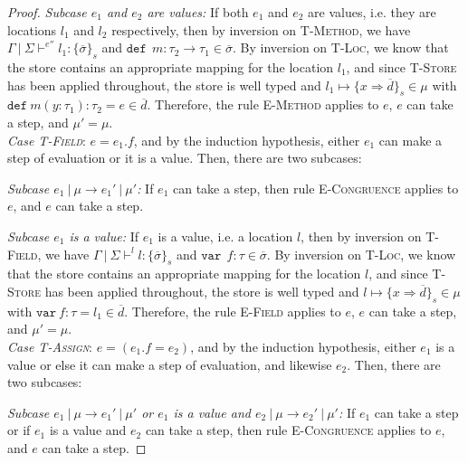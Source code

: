 \documentclass{llncs}
\newcommand{\keywadj}[1]{\mathtt{#1}}
\newcommand{\keyw}[1]{\keywadj{#1}~}
\begin{document}
\begin{proof}
\textit{Subcase $e_1$ and $e_2$ are values:} If both $e_1$ and $e_2$ are values, i.e. they are locations $l_1$ and $l_2$ respectively, then by inversion on \textsc{T-Method}, we have $\Gamma~|~\Sigma \vdash^{e''} l_1 : \{ \overline{\sigma} \}_s$ and $\keyw{def}~ m : \tau_2 \rightarrow \tau_1 \in \overline{\sigma}$. By inversion on \textsc{T-Loc}, we know that the store contains an appropriate mapping for the location $l_1$, and since \textsc{T-Store} has been applied throughout, the store is well typed and $l_1 \mapsto \{ x \Rightarrow \overline{d} \}_{s} \in \mu$ with $\keyw{def} m(y : \tau_1) : \tau_2 = e \in \overline{d}$. Therefore, the rule \textsc{E-Method} applies to $e$, $e$ can take a step, and $\mu' = \mu$.
\\

\noindent\textit{Case \textsc{T-Field}}:
$e = e_1.f$, and by the induction hypothesis, either $e_1$ can make a step of evaluation or it is a value. Then, there are two subcases:

\textit{Subcase $e_1~|~\mu \longrightarrow e_1'~|~\mu'$:} If $e_1$ can take a step, then rule \textsc{E-Congruence} applies to $e$, and $e$ can take a step.

\textit{Subcase $e_1$ is a value:} If $e_1$ is a value, i.e. a location $l$, then by inversion on \textsc{T-Field}, we have $\Gamma~|~\Sigma \vdash^l l : \{ \overline{\sigma} \}_s$ and $\keyw{var}~ f : \tau \in \overline{\sigma}$. By inversion on \textsc{T-Loc}, we know that the store contains an appropriate mapping for the location $l$, and since \textsc{T-Store} has been applied throughout, the store is well typed and $l \mapsto \{ x \Rightarrow \overline{d} \}_{s} \in \mu$ with $\keyw{var} f : \tau = l_1 \in \overline{d}$. Therefore, the rule \textsc{E-Field} applies to $e$, $e$ can take a step, and $\mu' = \mu$.
\\

\noindent\textit{Case \textsc{T-Assign}}:
$e = (e_1.f = e_2)$, and by the induction hypothesis, either $e_1$ is a value or else it can make a step of evaluation, and likewise $e_2$. Then, there are two subcases:

\textit{Subcase $e_1~|~\mu \longrightarrow e_1'~|~\mu'$ or $e_1$ is a value and $e_2~|~\mu \longrightarrow e_2'~|~\mu'$:} If $e_1$ can take a step or if $e_1$ is a value and $e_2$ can take a step, then rule \textsc{E-Congruence} applies to $e$, and $e$ can take a step.


\end{proof}
\end{document}
